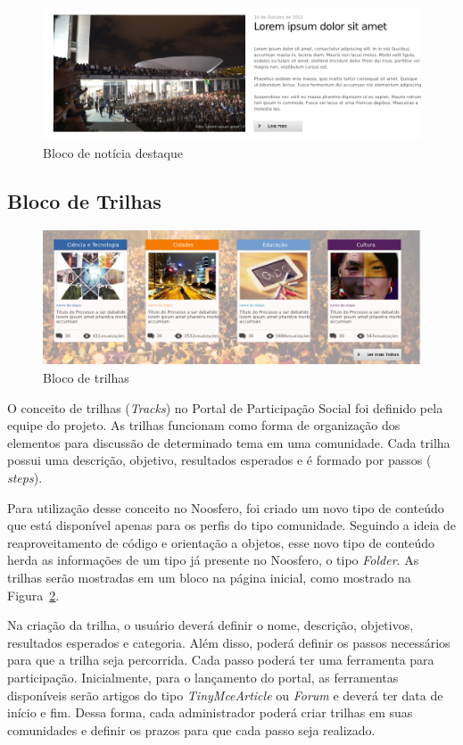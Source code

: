 \documentclass[[a4paper,11pt]{article}
\begin{document}
\begin{figure}[h]
\center
\includegraphics[scale=0.4]{bloco-noticia-destaque.png}
\caption{Bloco de notícia destaque}
\label{fig:bloco-noticia-destaque}
\end{figure}

\subsection{Bloco de Trilhas}

\begin{figure}[h]
\center
\includegraphics[scale=0.4]{bloco-trilhas.png}
\caption{Bloco de trilhas}
\label{fig:bloco-trilhas}
\end{figure}

O conceito de trilhas ({\it Tracks}) no Portal de Participação Social foi definido pela
equipe do projeto. As trilhas funcionam como forma de organização dos
elementos para discussão de determinado tema em uma comunidade. Cada trilha possui uma
descrição, objetivo, resultados esperados e é formado por passos ({\it
steps}).

Para utilização desse conceito no Noosfero, foi criado um novo tipo de
conteúdo que está disponível apenas para os perfis do tipo comunidade.
Seguindo a ideia de reaproveitamento de código e orientação a objetos,
esse novo tipo de conteúdo herda as informações de um tipo já presente
no Noosfero, o tipo {\it Folder}. As trilhas serão mostradas em um bloco
na página inicial, como mostrado na
Figura~\ref{fig:bloco-trilhas}.

Na criação da trilha, o usuário deverá definir o nome, descrição,
objetivos, resultados esperados e categoria. Além disso, poderá definir
os passos necessários para que a trilha seja percorrida. Cada passo
poderá ter uma ferramenta para participação. Inicialmente, para o
lançamento do portal, as ferramentas disponíveis serão artigos do tipo 
{\it TinyMceArticle} ou {\it Forum} e deverá ter data de início e fim.
Dessa forma, cada administrador poderá criar trilhas em suas
comunidades e definir os prazos para que cada passo seja realizado.
\end{document}
